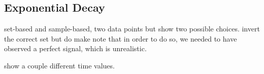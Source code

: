 \subsection{Exponential Decay}\label{ex:decay-set-sample}

set-based and sample-based, two data points but show two possible choices.
invert the correct set but do make note that in order to do so, we needed to have observed a perfect signal, which is unrealistic.

show a couple different time values.
